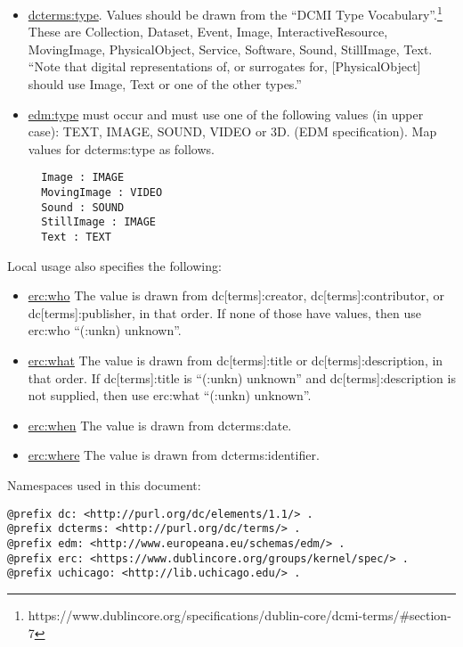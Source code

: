 \documentclass[11pt]{article}
\begin{document}
\begin{itemize}
  \item \underline{dcterms:type}. Values should be drawn from the ``DCMI Type Vocabulary''.\footnote{https://www.dublincore.org/specifications/dublin-core/dcmi-terms/\#section-7} These are Collection, Dataset, Event, Image, InteractiveResource, MovingImage, PhysicalObject, Service, Software, Sound, StillImage, Text. ``Note that digital representations of, or surrogates for, [PhysicalObject] should use Image, Text or one of the other types.''

  \item \underline{edm:type} must occur and must use one of the following values (in upper case): TEXT, IMAGE, SOUND, VIDEO or 3D. (EDM specification). Map values for dcterms:type as follows.

\begin{verbatim}
  Image : IMAGE
  MovingImage : VIDEO
  Sound : SOUND
  StillImage : IMAGE
  Text : TEXT
\end{verbatim}

\end{itemize}

Local usage also specifies the following:

\begin{itemize}
\item \underline{erc:who} The value is drawn from dc[terms]:creator, dc[terms]:contributor, or dc[terms]:publisher, in that order. If none of those have values, then use erc:who ``(:unkn) unknown''.
\item \underline{erc:what} The value is drawn from dc[terms]:title or dc[terms]:description, in that order. If dc[terms]:title is ``(:unkn) unknown'' and dc[terms]:description is not supplied, then use erc:what ``(:unkn) unknown''.
\item \underline{erc:when} The value is drawn from dcterms:date.
\item \underline{erc:where} The value is drawn from dcterms:identifier.
\end{itemize}

Namespaces used in this document:

\begin{verbatim}
@prefix dc: <http://purl.org/dc/elements/1.1/> .
@prefix dcterms: <http://purl.org/dc/terms/> .
@prefix edm: <http://www.europeana.eu/schemas/edm/> .
@prefix erc: <https://www.dublincore.org/groups/kernel/spec/> .
@prefix uchicago: <http://lib.uchicago.edu/> .
\end{verbatim}
\end{document}
